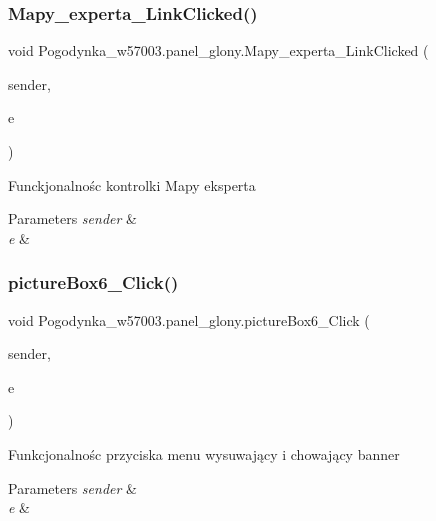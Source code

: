 \subsubsection{\texorpdfstring{Mapy\+\_\+experta\+\_\+\+Link\+Clicked()}{Mapy\_experta\_LinkClicked()}}
{\footnotesize\ttfamily void Pogodynka\+\_\+w57003.\+panel\+\_\+glony.\+Mapy\+\_\+experta\+\_\+\+Link\+Clicked (\begin{DoxyParamCaption}\item[{object}]{sender,  }\item[{Link\+Label\+Link\+Clicked\+Event\+Args}]{e }\end{DoxyParamCaption})\hspace{0.3cm}{\ttfamily [private]}}



Funckjonalnośc kontrolki Mapy eksperta 


\begin{DoxyParams}{Parameters}
{\em sender} & \\
\hline
{\em e} & \\
\hline
\end{DoxyParams}
\mbox{\label{class_pogodynka__w57003_1_1panel__glony_ab0736937098fec29cd5311a389c2b0b4}} 
\subsubsection{\texorpdfstring{picture\+Box6\+\_\+\+Click()}{pictureBox6\_Click()}}
{\footnotesize\ttfamily void Pogodynka\+\_\+w57003.\+panel\+\_\+glony.\+picture\+Box6\+\_\+\+Click (\begin{DoxyParamCaption}\item[{object}]{sender,  }\item[{Event\+Args}]{e }\end{DoxyParamCaption})\hspace{0.3cm}{\ttfamily [private]}}



Funkcjonalnośc przyciska menu wysuwający i chowający banner 


\begin{DoxyParams}{Parameters}
{\em sender} & \\
\hline
{\em e} & \\
\hline
\end{DoxyParams}
\mbox{\label{class_pogodynka__w57003_1_1panel__glony_a40e7412c72125b4544218fb03a4af1d3}} 

